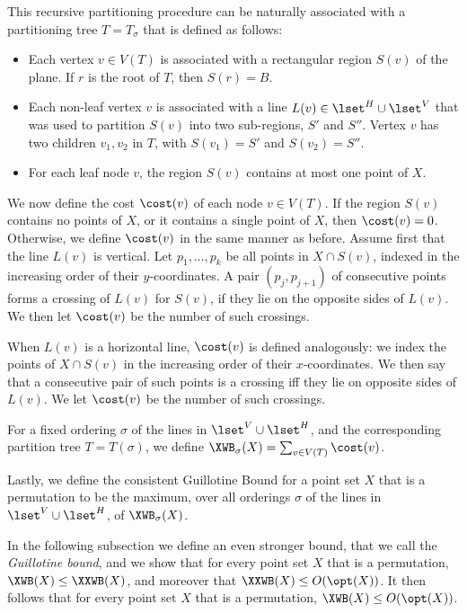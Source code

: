 \documentclass{toc}
\begin{document}
%
%

This recursive partitioning procedure can be naturally associated with a partitioning tree  $T=T_{\sigma}$ that is defined as follows: 

\begin{itemize}
\item Each vertex $v\in V(T)$ is associated with a rectangular region $S(v)$ of the plane. If $r$ is the root of $T$, then $S(r) =B$. 

\item Each non-leaf vertex $v$  is associated with a line $L(v)\in \lset^H\cup \lset^V$ that was used to partition $S(v)$ into two sub-regions, $S'$ and $S''$. Vertex $v$ has two children $v_1,v_2$ in $T$, with $S(v_1)=S'$ and $S(v_2)=S''$.

\item For each leaf node $v$, the region $S(v)$ contains at most one point of $X$.
\end{itemize}  




We now define the cost $\cost(v)$ of each node $v\in V(T)$. If the region $S(v)$ contains no points of $X$, or it contains a single point of $X$, then $\cost(v)=0$. Otherwise, we define $\cost(v)$ in the same manner as before. Assume first that the line $L(v)$ is vertical. Let $p_1, \ldots, p_k$  be all points in $X\cap S(v)$, indexed in the increasing order of their $y$-coordinates. A pair $(p_j, p_{j+1})$ of consecutive  points forms a crossing of $L(v)$ for $S(v)$, if they lie on the opposite sides of $L(v)$. We then let $\cost(v)$ be the number of such crossings. 

When $L(v)$ is a horizontal line, $\cost(v)$ is defined analogously: we index the points of $X\cap S(v)$ in the increasing order of their $x$-coordinates. We then say that a consecutive pair of such points is a crossing iff they lie on opposite sides of $L(v)$. We let $\cost(v)$ be the number of such crossings.

For a fixed ordering $\sigma$ of the lines in $\lset^V\cup \lset^H$, and the corresponding partition tree $T= T(\sigma)$, we define $\XWB_{\sigma}(X) = \sum_{v \in V(T)} \cost(v)$. 

Lastly, we define the consistent Guillotine Bound for a point set $X$ that is a permutation to be the maximum, over all orderings $\sigma$ of the lines in $\lset^V\cup \lset^H$, of $\XWB_{\sigma}(X)$.  


In the following subsection we define an even stronger bound, that we call the \emph{Guillotine bound}, and we show that for every point set $X$ that is a permutation, $\XWB(X)\leq \XXWB(X)$, and moreover that $\XXWB(X)\leq O(\opt(X))$. It then follows that for every point set $X$ that is a permutation, $\XWB(X)\leq O(\opt(X))$.
\end{document}
